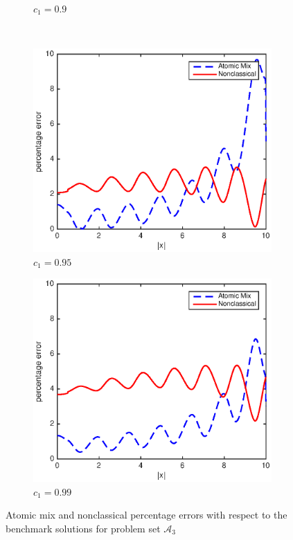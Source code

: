\documentclass[12pt]{article}
\newcommand{\seta}{\mathcal{A}}
\begin{document}
{\begin{figure}[p]
\begin{subfigure}{0.495\textwidth}
        \caption{$c_1 = 0.9$}
        \label{figerrC90}
    \end{subfigure}
    \\
    \centering
    \begin{subfigure}{0.495\textwidth}
        \centering
        \includegraphics[width=\textwidth]{NSE_err_C95.eps}
        \caption{$c_1 = 0.95$}
        \label{figerrC95}
    \end{subfigure}
    \hfill
    \begin{subfigure}{0.495\textwidth}
        \centering
        \includegraphics[width=\textwidth]{NSE_err_C99.eps}
        \caption{$c_1 = 0.99$}
        \label{figerrC99}
    \end{subfigure}
    \caption{Atomic mix and nonclassical percentage errors with respect to the benchmark solutions for problem set $\seta_3$}
    \label{figerrC2}
\end{figure}





}
\end{document}
